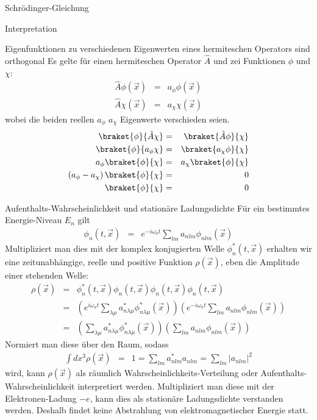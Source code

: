 \begin{chapter}{\titlestr}
\begin{section}{Schrödinger-Gleichung}
\begin{subsection}{Interpretation}
\begin{subsubsection}{Eigenfunktionen zu verschiedenen Eigenwerten eines hermiteschen Operators sind orthogonal}
\label{eigen_normality}
Es gelte für einen hermiteschen Operator $\hat{A}$ und zei Funktionen $\phi$ und $\chi$:
\begin{eqnarray*}
\hat{A}\phi(\vec{x}) &=& a_\phi\phi(\vec{x})\\
\hat{A}\chi(\vec{x}) &=& a_\chi\chi(\vec{x})
\end{eqnarray*}
wobei die beiden reellen $a_\phi$ $a_\chi$ Eigenwerte verschieden seien.
\begin{eqnarray*}
\braket{\phi}{\hat{A}\chi}&=&\braket{\hat{A}\phi}{\chi}\\
\braket{\phi}{a_\phi\chi}&=&\braket{a_\chi\phi}{\chi}\\
a_\phi\braket{\phi}{\chi}&=&a_\chi\braket{\phi}{\chi}\\
\left(a_\phi-a_\chi\right)\braket{\phi}{\chi}&=& 0\\
\braket{\phi}{\chi} &=& 0
\end{eqnarray*}
\end{subsubsection}

\begin{subsubsection}{Aufenthalts-Wahrscheinlichkeit und stationäre Ladungsdichte}
Für ein bestimmtes Energie-Niveau $E_n$ gilt
\begin{eqnarray*}
\phi_n(t,\vec{x}) &=& e^{-i\omega_n t}\sum_{lm} a_{nlm}\phi_{nlm}(\vec{x})
\end{eqnarray*}
Multipliziert man dies mit der komplex konjugierten Welle $\phi^*_n(t,\vec{x})$ erhalten wir eine zeitunabhängige, reelle und positive Funktion $\rho(\vec{x})$, eben die Amplitude einer stehenden Welle:
\begin{eqnarray*}
\rho(\vec{x})&=&\phi^*_n(t,\vec{x})\phi_n(t,\vec{x})\phi_n(t,\vec{x})\phi_n(t,\vec{x})\\
&=& \left(e^{i\omega_n t}\sum_{\lambda\mu} a^*_{n\lambda\mu}\phi^*_{n\lambda\mu}(\vec{x})\right)\left(e^{-i\omega_n t}\sum_{lm} a_{nlm}\phi_{nlm}(\vec{x})\right)\\
&=& \left(\sum_{\lambda\mu} a^*_{n\lambda\mu}\phi^*_{n\lambda\mu}(\vec{x})\right)\left(\sum_{lm} a_{nlm}\phi_{nlm}(\vec{x})\right)
\end{eqnarray*}
Normiert man diese über den Raum, sodass
\begin{eqnarray*}
\int dx^3 \rho(\vec{x}) &=& 1 = \sum_{lm} a^*_{nlm}a_{nlm}=\sum_{lm} |a_{nlm}|^2
\end{eqnarray*}
wird, kann $\rho(\vec{x})$ als räumlich Wahrscheinlichkeits-Verteilung oder Aufenthalts-Wahrscheinlichkeit interpretiert werden.
Multipliziert man diese mit der Elektronen-Ladung $-e$, kann dies als stationäre Ladungsdichte verstanden werden. Deshalb findet keine Abstrahlung von elektromagnetischer Energie statt.
\end{subsubsection}


\end{subsection}
\end{section}
\end{chapter}
